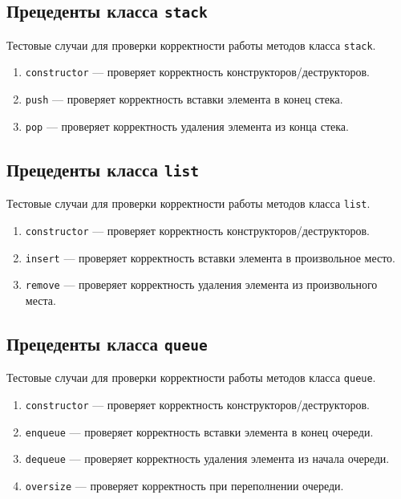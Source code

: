\documentclass[a4paper,12pt]{article}
\begin{document}
\subsection{Прецеденты класса {\tt stack}}

Тестовые случаи для проверки корректности работы методов класса {\tt stack}.

\begin{enumerate}

\item
\verb!constructor! — проверяет корректность конструкторов/деструкторов.

\item
\verb!push! — проверяет корректность вставки элемента в конец стека.

\item
\verb!pop! — проверяет корректность удаления элемента из конца стека.

\end{enumerate}

\subsection{Прецеденты класса {\tt list}}

Тестовые случаи для проверки корректности работы методов класса {\tt list}.

\begin{enumerate}

\item
\verb!constructor! — проверяет корректность конструкторов/деструкторов.

\item
\verb!insert! — проверяет корректность вставки элемента в произвольное место.

\item
\verb!remove! — проверяет корректность удаления элемента из произвольного места.

\end{enumerate}

\subsection{Прецеденты класса {\tt queue}}

Тестовые случаи для проверки корректности работы методов класса {\tt queue}.

\begin{enumerate}

\item
\verb!constructor! — проверяет корректность конструкторов/деструкторов.

\item
\verb!enqueue! — проверяет корректность вставки элемента в конец очереди.

\item
\verb!dequeue! — проверяет корректность удаления элемента из начала очереди.

\item
\verb!oversize! — проверяет корректность при переполнении очереди.

\end{enumerate}
\end{document}
